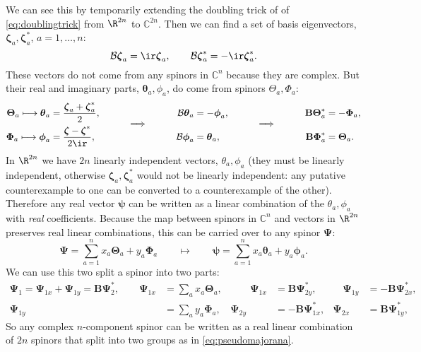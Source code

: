 \documentclass[11pt]{article}
\newcommand{\cc}{^\ast}
\newcommand{\B}{\mathbf{B}}
\newcommand{\Cb}{\mathbb{C}}
\newcommand{\psib}{\boldsymbol{\psi}}
\newcommand{\Psib}{\boldsymbol{\Psi}}
\newcommand{\thetab}{\boldsymbol{\theta}}
\newcommand{\Thetab}{\boldsymbol{\Theta}}
\newcommand{\phib}{\boldsymbol{\phi}}
\newcommand{\Phib}{\boldsymbol{\Phi}}
\newcommand{\zetab}{\boldsymbol{\zeta}}
\begin{document}
We can see this by temporarily extending the doubling trick of  of \cref{eq:doublingtrick} from \(\R^{2n}\) to \(\Cb^{2n}\).
Then we can find a set of basis eigenvectors, \(\zetab_a,\zetab\cc_a\), \(a = 1,\ldots,n\):
%
\begin{equation*}
  \mathcal{B} \zetab_a = \ir \zetab_a,
  \qquad
  \mathcal{B} \zetab\cc_a = -\ir \zetab\cc_a.
\end{equation*}
%
These vectors do not come from any spinors in \(\Cb^n\) because they are complex.
But their real and imaginary parts, \(\thetab_a,\phi_a\), do come from spinors \(\Theta_a,\Phi_a\):
%
\begin{equation*}
\begin{aligned}
  \Thetab_a \longmapsto \thetab_a &= \frac{\zetab_a + \zetab\cc_a}{2}, &
    &&
  \mathcal{B} \thetab_a &= - \phib_a, &
    &&
  \B \Thetab_a\cc &= - \Phib_a, \\[-0.8em]
  &&
    \qquad &\smash{\implies} \qquad &
  &&
    \qquad &\smash{\implies} \qquad \\[-0.8em]
  \Phib_a \longmapsto \phib_a &= \frac{\zetab - \zetab\cc}{2\ir}, &
    &&
  \mathcal{B} \phib_a &= \thetab_a, &
    &&
  \B \Phib_a\cc &= \Thetab_a.
\end{aligned}
\end{equation*}
%
In \(\R^{2n}\) we have \(2n\) linearly independent vectors, \(\theta_a,\phi_a\)
(they must be linearly independent, otherwise \(\zetab_a,\zetab\cc_a\) would not be linearly independent: any putative counterexample to one can be converted to a counterexample of the other).
Therefore any real vector \(\psib\) can be written as a linear combination of the \(\theta_a,\phi_a\) with \emph{real} coefficients.
Because the map between spinors in \(\Cb^n\) and vectors in \(\R^{2n}\) preserves real linear combinations, this can be carried over to any spinor \(\Psib\):
%
\begin{equation*}
  \Psib = \sum_{a=1}^n x_a \Thetab_a + y_a \Phib_a
  \qquad \longmapsto \qquad
  \psib = \sum_{a=1}^n x_a \thetab_a + y_a \phib_a.
\end{equation*}
%
We can use this two split a spinor into two parts:
%
\begin{equation*}
\begin{aligned}
  \Psib_1 = \Psib_{1x} + \Psib_{1y} = \B \Psib_2\cc, 
  \qquad
  \Psib_{1x} &= \sum_a x_a \Thetab_a, 
  &\qquad
  \Psib_{1x} &=   \B \Psib_{2y}\cc, &\quad
  \Psib_{1y} &= - \B \Psib_{2x}\cc, 
  \\
  \Psib_{1y} &= \sum_a y_a \Phib_a, 
  &
  \Psib_{2y} &= - \B \Psib_{1x}\cc, &
  \Psib_{2x} &=   \B \Psib_{1y}\cc,
\end{aligned}
\end{equation*}
%
So any complex \(n\)-component spinor can be written as a real linear combination of \(2n\) spinors that split into two groups as in \cref{eq:pseudomajorana}.
\end{document}
